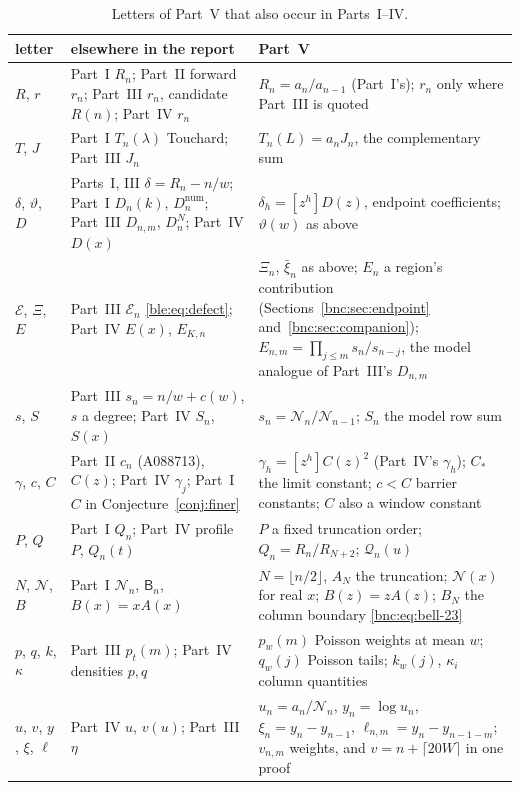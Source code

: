 \documentclass[11pt]{article}
\numberwithin{equation}{section}
\theoremstyle{definition}
\theoremstyle{remark}
\begin{document}
\begin{table}[htbp]
\centering\footnotesize
\caption{Letters of Part~V that also occur in Parts~I--IV.}\label{bnc:tab:notation}
\begin{tabular}{@{}l>{\raggedright\arraybackslash}p{}>{\raggedright\arraybackslash}p{}@{}}
\toprule
letter & elsewhere in the report & Part~V\\
\midrule
$R$, $r$ & Part~I $R_n$; Part~II forward $r_n$; Part~III $r_n$,
 candidate $R(n)$; Part~IV $r_n$
 & $R_n=a_n/a_{n-1}$ (Part~I's); $r_n$ only where Part~III is quoted\\
$T$, $J$ & Part~I $T_n(\lambda)$ Touchard; Part~III $J_n$
 & $T_n(L)=a_nJ_n$, the complementary sum\\
$\delta$, $\vartheta$, $D$ & Parts~I, III $\delta=R_n-n/w$; Part~I
 $D_n(k)$, $D_n^{\mathrm{num}}$; Part~III $D_{n,m}$, $D_n^N$; Part~IV
 $D(x)$
 & $\delta_h=[z^h]D(z)$, endpoint coefficients; $\vartheta(w)$ as above\\
$\mathcal E$, $\Xi$, $E$ & Part~III $\mathcal E_n$ \eqref{ble:eq:defect};
 Part~IV $E(x)$, $E_{K,n}$
 & $\Xi_n$, $\bar\xi_n$ as above; $E_n$ a region's contribution
 (Sections~\ref{bnc:sec:endpoint} and~\ref{bnc:sec:companion});
 $E_{n,m}=\prod_{j\le m}s_n/s_{n-j}$, the model analogue of Part~III's
 $D_{n,m}$\\
$s$, $S$ & Part~III $s_n=n/w+c(w)$, $s$ a degree; Part~IV $S_n$, $S(x)$
 & $s_n=\mathcal N_n/\mathcal N_{n-1}$; $S_n$ the model row sum\\
$\gamma$, $c$, $C$ & Part~II $c_n$ (A088713), $C(z)$; Part~IV $\gamma_j$;
 Part~I $C$ in Conjecture~\ref{conj:finer}
 & $\gamma_h=[z^h]C(z)^2$ (Part~IV's $\gamma_h$); $C_*$ the limit
 constant; $c<C$ barrier constants; $C$ also a window constant\\
$P$, $Q$ & Part~I $Q_n$; Part~IV profile $P$, $Q_n(t)$
 & $P$ a fixed truncation order; $Q_n=R_n/R_{N+2}$; $\mathcal Q_n(u)$\\
$N$, $\mathcal N$, $B$ & Part~I $\mathcal N_n$, $\mathsf B_n$, $B(x)=xA(x)$
 & $N=\lfloor n/2\rfloor$, $A_N$ the truncation; $\mathcal N(x)$ for real
 $x$; $B(z)=zA(z)$; $B_N$ the column boundary \eqref{bnc:eq:bell-23}\\
$p$, $q$, $k$, $\kappa$ & Part~III $p_t(m)$; Part~IV densities $p,q$
 & $p_w(m)$ Poisson weights at mean $w$; $q_w(j)$ Poisson tails;
 $k_w(j)$, $\kappa_i$ column quantities\\
$u$, $v$, $y$, $\xi$, $\ell$ & Part~IV $u$, $v(u)$; Part~III $\eta$
 & $u_n=a_n/\mathcal N_n$, $y_n=\log u_n$, $\xi_n=y_n-y_{n-1}$,
 $\ell_{n,m}=y_n-y_{n-1-m}$; $v_{n,m}$ weights, and $v=n+\lceil20W\rceil$
 in one proof\\
\bottomrule
\end{tabular}
\end{table}
\end{document}
